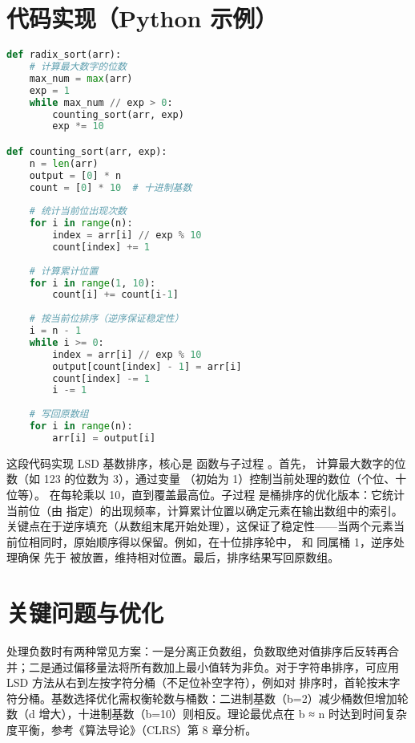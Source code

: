 \chapter{代码实现（Python 示例）}
\begin{lstlisting}[language=python]
def radix_sort(arr):
    # 计算最大数字的位数
    max_num = max(arr)
    exp = 1
    while max_num // exp > 0:
        counting_sort(arr, exp)
        exp *= 10

def counting_sort(arr, exp):
    n = len(arr)
    output = [0] * n
    count = [0] * 10  # 十进制基数
    
    # 统计当前位出现次数
    for i in range(n):
        index = arr[i] // exp % 10
        count[index] += 1
    
    # 计算累计位置
    for i in range(1, 10):
        count[i] += count[i-1]
    
    # 按当前位排序（逆序保证稳定性）
    i = n - 1
    while i >= 0:
        index = arr[i] // exp % 10
        output[count[index] - 1] = arr[i]
        count[index] -= 1
        i -= 1
    
    # 写回原数组
    for i in range(n):
        arr[i] = output[i]
\end{lstlisting}
这段代码实现 LSD 基数排序，核心是  函数与子过程 。首先， 计算最大数字的位数（如 123 的位数为 3），通过变量 （初始为 1）控制当前处理的数位（个位、十位等）。 在每轮乘以 10，直到覆盖最高位。子过程  是桶排序的优化版本：它统计当前位（由  指定）的出现频率，计算累计位置以确定元素在输出数组中的索引。关键点在于逆序填充（从数组末尾开始处理），这保证了稳定性——当两个元素当前位相同时，原始顺序得以保留。例如，在十位排序轮中， 和  同属桶 1，逆序处理确保  先于  被放置，维持相对位置。最后，排序结果写回原数组。\par
\chapter{关键问题与优化}
处理负数时有两种常见方案：一是分离正负数组，负数取绝对值排序后反转再合并；二是通过偏移量法将所有数加上最小值转为非负。对于字符串排序，可应用 LSD 方法从右到左按字符分桶（不足位补空字符），例如对  排序时，首轮按末字符分桶。基数选择优化需权衡轮数与桶数：二进制基数（b=2）减少桶数但增加轮数（d 增大），十进制基数（b=10）则相反。理论最优点在 b ≈ n 时达到时间复杂度平衡，参考《算法导论》（CLRS）第 8 章分析。\par
